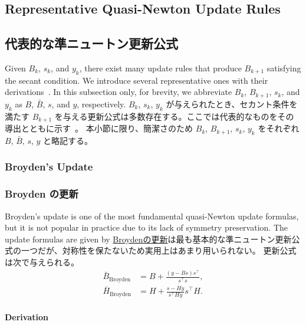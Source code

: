 \documentclass[0_main]{subfiles}
\begin{document}
\ifEn
    \subsection{Representative Quasi-Newton Update Rules}
\else
    \subsection{代表的な準ニュートン更新公式}
\fi

\ifEn
    Given $B_k$, $s_k$, and $y_k$, there exist many update rules that produce $B_{k+1}$ satisfying the secant condition. We introduce several representative ones with their derivations~\citep{dennisjr.QuasiNewtonMethodsMotivation1977a}.
    In this subsection only, for brevity, we abbreviate $B_k$, $B_{k+1}$, $s_k$, and $y_k$ as $B$, $\bar{B}$, $s$, and $y$, respectively.
\else
    $B_k$, $s_k$, $y_k$ が与えられたとき、セカント条件を満たす $B_{k+1}$ を与える更新公式は多数存在する。ここでは代表的なものをその導出とともに示す~\citep{dennisjr.QuasiNewtonMethodsMotivation1977a}。
    本小節に限り、簡潔さのため $B_k$, $B_{k+1}$, $s_k$, $y_k$ をそれぞれ $B$, $\bar{B}$, $s$, $y$ と略記する。
\fi

\ifEn
    \subsubsection{Broyden's Update}
\else
    \subsubsection{Broyden の更新}
\fi

\ifEn
    Broyden's update is one of the most fundamental quasi-Newton update formulas, but it is not popular in practice due to its lack of symmetry preservation.
    The update formulas are given by
\else
    \href{https://en.wikipedia.org/wiki/Broyden%27s_method}{Broydenの更新}は最も基本的な準ニュートン更新公式の一つだが、対称性を保たないため実用上はあまり用いられない。
    更新公式は次で与えられる。
\fi
\begin{align*}
    \bar{B}_{\mathrm{Broyden}} & = B + \frac{(y - Bs)s^\top}{s^\top s},   \\
    \bar{H}_{\mathrm{Broyden}} & = H + \frac{s - Hy}{s^\top Hy} s^\top H.
\end{align*}

\ifEn
    \paragraph{Derivation}
\else
\end{document}
